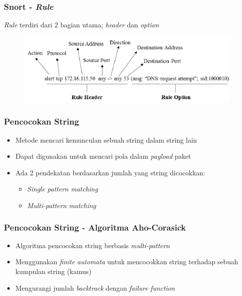 \documentclass{beamer}
\begin{document}

  \begin{frame}
  \frametitle{Snort - \emph{Rule}}
  \emph{Rule} terdiri dari 2 bagian utama; \emph{header} dan \emph{option}
  \begin{figure}
    \includegraphics[width=0.8\linewidth]{../src/resources/rule.png}
  \end{figure}
  \end{frame}


  \begin{frame}
  \frametitle{Pencocokan String}
  \begin{itemize}
    \item Metode mencari kemunculan sebuah string dalam string lain
    \item Dapat digunakan untuk mencari pola dalam \emph{payload} paket
    \item Ada 2 pendekatan berdasarkan jumlah yang string dicocokkan:
      \begin{itemize}
        \item \emph{Single pattern matching}
        \item \emph{Multi-pattern matching}
      \end{itemize}
  \end{itemize}
  \end{frame}


  \begin{frame}
  \frametitle{Pencocokan String - Algoritma Aho-Corasick}
  \begin{itemize}
    \item Algoritma pencocokan string berbasis \emph{multi-pattern}
    \item Menggunakan \emph{finite automata} untuk mencocokkan string terhadap sebuah kumpulan string (kamus)
    \item Mengurangi jumlah \emph{backtrack} dengan \emph{failure function}
  \end{itemize}
  \end{frame}
  
\end{document}
